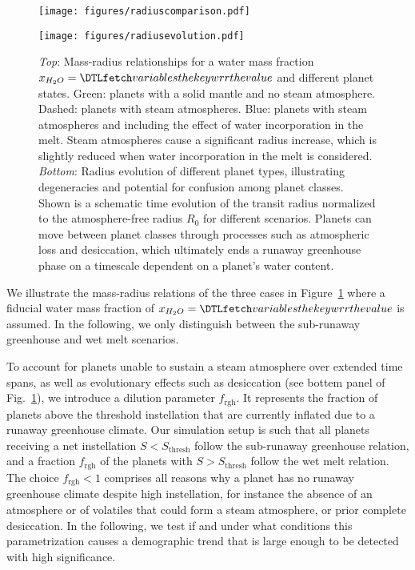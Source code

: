 \documentclass[twocolumn,twocolappendix]{aastex631}
\begin{document}
\begin{figure}
    \begin{centering}
        \texttt{[image: figures/radiuscomparison.pdf]}
    \end{centering}
    \begin{centering}
        \texttt{[image: figures/radiusevolution.pdf]}
        \caption{
            \textit{Top}: Mass-radius relationships for a water mass fraction $x_{H_2O}= \var{wrr}$ and different planet states. Green: planets with a solid mantle and no steam atmosphere. Dashed: planets with steam atmospheres. Blue: planets with steam atmospheres and including the effect of water incorporation in the melt.
                Steam atmospheres cause a significant radius increase, which is slightly reduced when water incorporation in the melt is considered.
            \textit{Bottom}: Radius evolution of different planet types, illustrating degeneracies and potential for confusion among planet classes. Shown is a schematic time evolution of the transit radius normalized to the atmosphere-free radius $R_\mathrm{0}$ for different scenarios. Planets can move between planet classes through processes such as atmospheric loss and desiccation, which ultimately ends a runaway greenhouse phase on a timescale dependent on a planet's water content.}
        \label{fig:radiusevolution}
    \end{centering}
\end{figure}
We illustrate the mass-radius relations of the three cases in Figure~\ref{fig:radiusevolution} where a fiducial water mass fraction of $x_{H_2O}= \var{wrr}$ is assumed. %
In the following, we only distinguish between the sub-runaway greenhouse and wet melt scenarios.

To account for planets unable to sustain a steam atmosphere over extended time spans, as well as evolutionary effects such as desiccation (see bottem panel of Fig.~\ref{fig:radiusevolution}), we introduce a dilution parameter $f_\mathrm{rgh}$.
It represents the fraction of planets above the threshold instellation that are currently inflated due to a runaway greenhouse climate.
Our simulation setup is such that all planets receiving a net instellation $S < S_\mathrm{thresh}$ follow the sub-runaway greenhouse relation, and a fraction $f_\mathrm{rgh}$ of the planets with $S > S_\mathrm{thresh}$ follow the wet melt relation.
The choice $f_\mathrm{rgh} < 1$ comprises all reasons why a planet has no runaway greenhouse climate despite high instellation, for instance the absence of an atmosphere or of volatiles that could form a steam atmosphere, or prior complete desiccation.
In the following, we test if and under what conditions this parametrization causes a demographic trend that is large enough to be detected with high significance.
\end{document}
